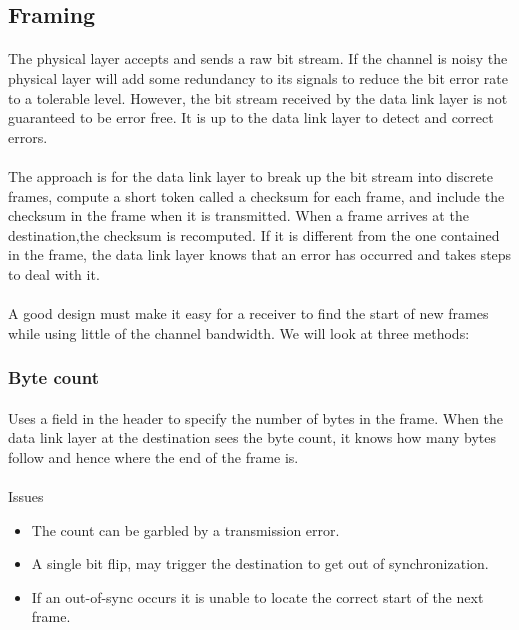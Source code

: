 \documentclass[../resumosRCOM.tex]{subfiles}
\begin{document}
\subsection{Framing}
\paragraph{}
The physical layer accepts and sends a raw bit stream. 
If the channel is noisy the physical layer will add some 
redundancy to its signals to reduce the bit error rate to a tolerable level. 
However, the bit stream received by the data link layer is not guaranteed to 
be error free. It is up to the data link layer to detect and correct errors.
\paragraph{}
The approach is for the data link layer to break up the bit stream into
discrete frames, compute a short token called a checksum for each frame, 
and include the checksum in the frame when it is transmitted.
When a frame arrives at the destination,the checksum is recomputed. 
If it is different from the one contained in the frame, the data link layer
knows that an error has occurred and takes steps to deal with it.
\paragraph{}
A good design must make it easy for a receiver to find the start of new frames
while using little of the channel bandwidth. We will look at three methods:

\subsubsection{Byte count}
\paragraph{}
Uses a field in the header to specify the number of bytes in the 
frame. When the data link layer at the destination sees the byte count,
it knows how many bytes follow and hence where the end of the frame is.

\paragraph{}
Issues
\begin{itemize}
    \item The count can be garbled by a transmission error.     
    \item A single bit flip, may trigger the destination to get
    out of synchronization. 
    \item If an out-of-sync occurs it is unable to locate the correct
    start of the next frame.
\end{itemize}
\end{document}
